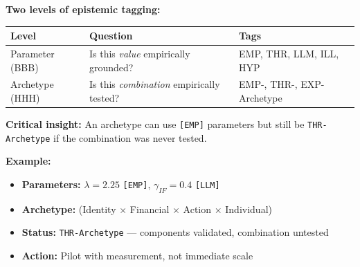 \begin{tcolorbox}[colback=yellow!5!white, colframe=yellow!75!black,
    title=\textbf{Key Distinction: Parameter vs. Archetype Epistemic Status}]

\textbf{Two levels of epistemic tagging:}

\begin{center}
\renewcommand{\arraystretch}{1.2}
\begin{tabular}{@{}lll@{}}
\toprule
\textbf{Level} & \textbf{Question} & \textbf{Tags} \\
\midrule
Parameter (BBB) & Is this \textit{value} empirically grounded? & EMP, THR, LLM, ILL, HYP \\
Archetype (HHH) & Is this \textit{combination} empirically tested? & EMP-, THR-, EXP-Archetype \\
\bottomrule
\end{tabular}
\end{center}

\textbf{Critical insight:} An archetype can use \texttt{[EMP]} parameters but still be \texttt{THR-Archetype} if the combination was never tested.

\textbf{Example:}
\begin{itemize}[nosep]
    \item \textbf{Parameters:} $\lambda = 2.25$ \texttt{[EMP]}, $\gamma_{IF} = 0.4$ \texttt{[LLM]}
    \item \textbf{Archetype:} (Identity $\times$ Financial $\times$ Action $\times$ Individual)
    \item \textbf{Status:} \texttt{THR-Archetype} --- components validated, combination untested
    \item \textbf{Action:} Pilot with measurement, not immediate scale
\end{itemize}

\end{tcolorbox}

